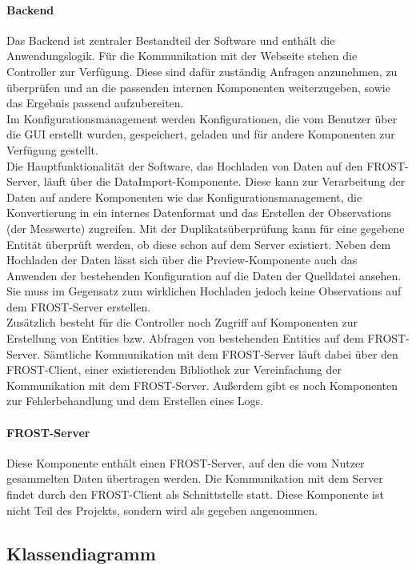 \paragraph{Backend}
Das Backend ist zentraler Bestandteil der Software und enthält die Anwendungslogik.
Für die Kommunikation mit der Webseite stehen die Controller zur Verfügung.
Diese sind dafür zuständig Anfragen anzunehmen, zu überprüfen und an die passenden internen Komponenten weiterzugeben, sowie das Ergebnis passend aufzubereiten.\\

Im Konfigurationsmanagement werden Konfigurationen, die vom Benutzer über die GUI erstellt wurden, gespeichert, geladen und für andere Komponenten zur Verfügung gestellt.\\

Die Hauptfunktionalität der Software, das Hochladen von Daten auf den FROST-Server, läuft über die DataImport-Komponente.
Diese kann zur Verarbeitung der Daten auf andere Komponenten wie das Konfigurationsmanagement, die Konvertierung in ein internes Datenformat und das Erstellen der Observations (der Messwerte) zugreifen.
Mit der Duplikatsüberprüfung kann für eine gegebene Entität überprüft werden, ob diese schon auf dem Server existiert.
Neben dem Hochladen der Daten lässt sich über die Preview-Komponente auch das Anwenden der bestehenden Konfiguration auf die Daten der Quelldatei ansehen.
Sie muss im Gegensatz zum wirklichen Hochladen jedoch keine Observations auf dem FROST-Server erstellen.\\

Zusätzlich besteht für die Controller noch Zugriff auf Komponenten zur Erstellung von Entities bzw. Abfragen von bestehenden Entities auf dem FROST-Server.
Sämtliche Kommunikation mit dem FROST-Server läuft dabei über den FROST-Client, einer existierenden Bibliothek zur Vereinfachung der Kommunikation mit dem FROST-Server.
Außerdem gibt es noch Komponenten zur Fehlerbehandlung und dem Erstellen eines Logs.

\paragraph{FROST-Server}
Diese Komponente enthält einen FROST-Server, auf den die vom Nutzer gesammelten Daten übertragen werden.
Die Kommunikation mit dem Server findet durch den FROST-Client als Schnittstelle statt.
Diese Komponente ist nicht Teil des Projekts, sondern wird als gegeben angenommen.

\subsection{Klassendiagramm}

